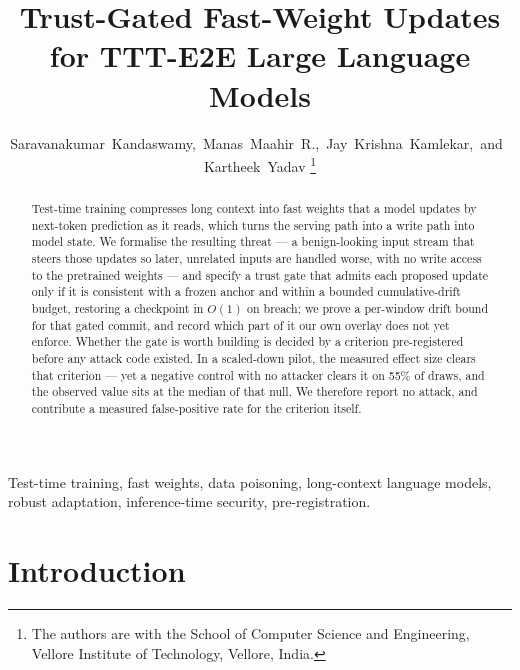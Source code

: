 \documentclass[journal]{IEEEtran}
\begin{document}
\title{Trust-Gated Fast-Weight Updates for TTT-E2E Large Language Models}

\author{Saravanakumar~Kandaswamy,~Manas~Maahir~R.,~Jay~Krishna~Kamlekar,~and~Kartheek~Yadav%
\thanks{The authors are with the School of Computer Science and Engineering,
Vellore Institute of Technology, Vellore, India.}}

\maketitle

\begin{abstract}
Test-time training compresses long context into fast weights that a model
updates by next-token prediction as it reads, which turns the serving path into a
write path into model state. We formalise the resulting threat --- a
benign-looking input stream that steers those updates so later, unrelated
inputs are handled worse, with no write access to the pretrained weights --- and
specify a trust gate that admits each proposed update only if it is consistent
with a frozen anchor and within a bounded cumulative-drift budget, restoring a
checkpoint in $O(1)$ on breach; we prove a per-window drift bound for that gated
commit, and record which part of it our own overlay does not yet enforce.
Whether the gate is worth building is decided by a
criterion pre-registered before any attack code existed. In a scaled-down pilot,
the measured effect size clears that criterion --- yet a negative control with no
attacker clears it on 55\% of draws, and the observed value sits at the median of
that null. We therefore report no attack, and contribute a measured
false-positive rate for the criterion itself.
\end{abstract}

\begin{IEEEkeywords}
Test-time training, fast weights, data poisoning, long-context language models,
robust adaptation, inference-time security, pre-registration.
\end{IEEEkeywords}


\section{Introduction}
\end{document}
